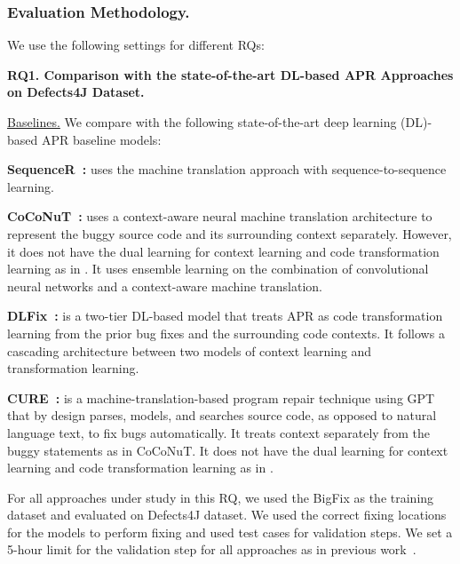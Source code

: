 \subsubsection{Evaluation Methodology.}
We use the following settings for different RQs:

{\bf RQ1. Comparison with the state-of-the-art DL-based APR Approaches on
  Defects4J Dataset.}

\underline{Baselines.} We compare {\tool} with the following
state-of-the-art deep learning (DL)-based APR baseline models:



{\bf SequenceR~\cite{chen2018sequencer}: } uses the machine
translation approach with sequence-to-sequence learning.

{\bf CoCoNuT~\cite{lutellier2020coconut}:} uses a context-aware neural
machine translation architecture to represent the buggy source code
and its surrounding context separately. However, it does not have the
dual learning for context learning and code transformation learning as
in {\tool}. It uses ensemble learning on the combination of
convolutional neural networks and a context-aware machine translation.

{\bf DLFix~\cite{icse20}: } is a two-tier DL-based model that
treats APR as code transformation learning from the prior bug fixes
and the surrounding code contexts. It follows a cascading architecture
between two models of context learning and transformation learning.

{\bf CURE~\cite{cure-icse21}: } is a machine-translation-based program repair
technique using GPT~\cite{radford2018improving} that by design parses, models, and searches source code, as
opposed to natural language text, to fix bugs automatically. It treats
context separately from the buggy statements as in CoCoNuT. It does
not have the dual learning for context learning and code
transformation learning as in {\tool}.



For all approaches under study in this RQ, we used the BigFix as the
training dataset and evaluated on Defects4J dataset. 
We used the correct fixing locations for the models to perform fixing
and used test cases for validation steps.  We set a 5-hour limit for
the validation step for all approaches as in previous
work~\cite{icse20,tbar-issta19}.


